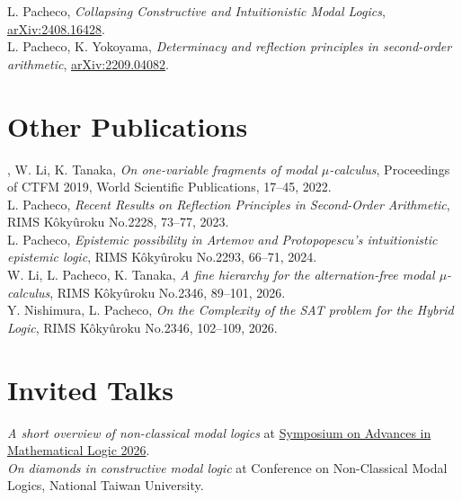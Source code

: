 \documentclass[11pt, a4paper]{article}
\newcommand{\years}[1]{\marginnote{\scriptsize #1}}
\newcommand{\highlightme}[1]{{#1}}
\begin{document}
\highlightme{L. Pacheco}, \emph{Collapsing Constructive and Intuitionistic Modal Logics}, \href{https://arxiv.org/abs/2408.16428}{arXiv:2408.16428}. \\

\highlightme{L. Pacheco}, K. Yokoyama, \emph{Determinacy and reflection principles in second-order arithmetic}, \href{https://arxiv.org/abs/2209.04082}{arXiv:2209.04082}. \\




\section*{Other Publications}

\noindent \highlightme{L. Pacheco}, W. Li, K. Tanaka, \emph{On one-variable fragments of modal $\mu$-calculus}, Proceedings of CTFM 2019, World Scientific Publications, 17--45, 2022. \\

\highlightme{L. Pacheco}, \emph{Recent Results on Reflection Principles in Second-Order Arithmetic}, RIMS Kôkyûroku No.2228, 73--77, 2023. \\

\highlightme{L. Pacheco}, \emph{Epistemic possibility in Artemov and Protopopescu's intuitionistic epistemic logic}, RIMS Kôkyûroku No.2293, 66--71, 2024. \\

W. Li, \highlightme{L. Pacheco}, K. Tanaka, \emph{A fine hierarchy for the alternation-free modal $\mu$-calculus}, RIMS Kôkyûroku No.2346, 89--101, 2026. \\

Y. Nishimura, \highlightme{L. Pacheco}, \emph{On the Complexity of the SAT problem for the Hybrid Logic}, RIMS Kôkyûroku No.2346, 102--109, 2026. \\




\section*{Invited Talks}

\years{2026} \emph{A short overview of non-classical modal logics} at \href{https://sites.google.com/view/saml2026/%E3%83%9B%E3%83%BC%E3%83%A0}{Symposium on Advances in Mathematical Logic 2026}. \\

\years{2025} \emph{On diamonds in constructive modal logic} at Conference on Non-Classical Modal Logics, National Taiwan University.\\
\end{document}
